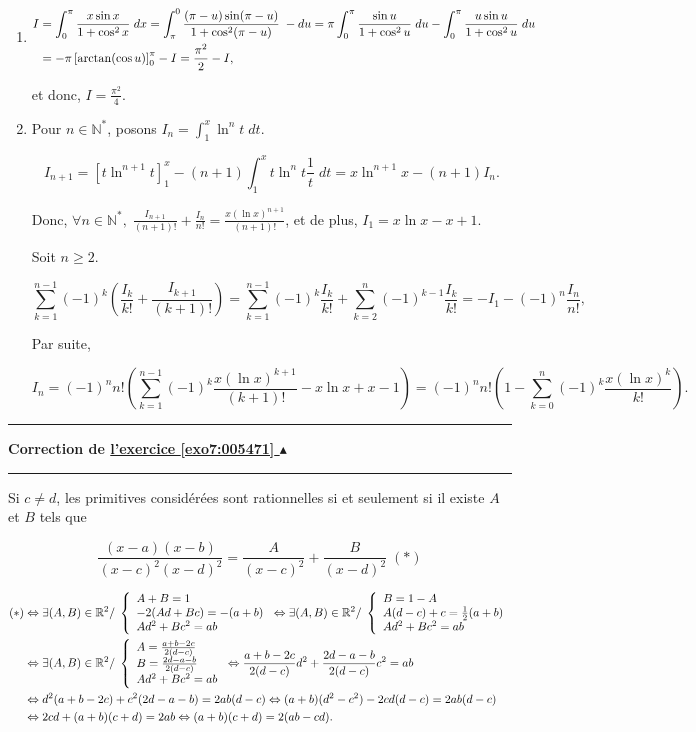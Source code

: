 \documentclass[11pt,a4paper]{article}
\newcommand{\Nn}{\mathbb{N}} \newcommand{\N}{\mathbb{N}}
\newcommand{\Rr}{\mathbb{R}} \newcommand{\R}{\mathbb{R}}
\newcommand{\Arctan}{\mathop{\mathrm{arctan}}\nolimits}
\newcounter{exo}
\newcommand{\correction}[1]{\hypertarget{cor7:#1}{}\label{cor7:#1}{\bf Correction de \hyperlink{exo7:#1}{l'exercice \ref{exo7:#1} $\blacktriangle$}}\vspace{1mm}\hrule\vspace{1mm}}
\newcommand{\fincorrection}{\vspace{1mm}\hrule\vspace*{7mm}}
\begin{document}
\begin{enumerate}
\item 

\begin{align*}\ensuremath
I&=\int_{0}^{\pi}\frac{x\sin x}{1+\cos^2x}\;dx=\int_{\pi}^{0}\frac{(\pi-u)\sin(\pi-u)}{1+\cos^2(\pi-u)}\;-du
=\pi\int_{0}^{\pi}\frac{\sin u}{1+\cos^2u}\;du-\int_{0}^{\pi}\frac{u\sin u}{1+\cos^2u}\;du\\
 &=-\pi\left[\Arctan(\cos u)\right]_{0}^{\pi}-I=\frac{\pi^2}{2}-I,
\end{align*}

et donc, $I=\frac{\pi^2}{4}$.

\item  Pour $n\in\Nn^*$, posons $I_n=\int_{1}^{x}\ln^nt\;dt$.

$$I_{n+1}=\left[t\ln^{n+1}t\right]_{1}^{x}-(n+1)\int_{1}^{x}t\ln^nt\frac{1}{t}\;dt=x\ln^{n+1}x-(n+1)I_n.$$

Donc, $\forall n\in\Nn^*,\;\frac{I_{n+1}}{(n+1)!}+\frac{I_n}{n!}=\frac{x(\ln x)^{n+1}}{(n+1)!}$, et de plus, $I_1=x\ln x-x+1$.

Soit $n\geq2$.

$$\sum_{k=1}^{n-1}(-1)^k(\frac{I_k}{k!}+\frac{I_{k+1}}{(k+1)!})=\sum_{k=1}^{n-1}(-1)^k\frac{I_k}{k!}+\sum_{k=2}^{n}(-1)^{k-1}\frac{I_k}{k!}=-I_1-(-1)^n\frac{I_n}{n!},$$

Par suite,

$$I_n=(-1)^nn!(\sum_{k=1}^{n-1}(-1)^k\frac{x(\ln x)^{k+1}}{(k+1)!}-x\ln x+x-1)=(-1)^nn!(1-\sum_{k=0}^{n}(-1)^{k}\frac{x(\ln x)^{k}}{k!}).$$
\end{enumerate}
\fincorrection
\correction{005471}
Si $c\neq d$, les primitives considérées sont rationnelles si et seulement si il existe $A$ et $B$ tels que

$$\frac{(x-a)(x-b)}{(x-c)^2(x-d)^2}=\frac{A}{(x-c)^2}+\frac{B}{(x-d)^2}\;(*)$$

\begin{align*}\ensuremath
(*)&\Leftrightarrow\exists(A,B)\in\Rr^2/\;\left\{
\begin{array}{l}
A+B=1\\
-2(Ad+Bc)=-(a+b)\\
Ad^2+Bc^2=ab
\end{array}
\right.\Leftrightarrow\exists(A,B)\in\Rr^2/\;\left\{
\begin{array}{l}
B=1-A\\
A(d-c)+c=\frac{1}{2}(a+b)\\
Ad^2+Bc^2=ab
\end{array}
\right.
\\
 &\Leftrightarrow\exists(A,B)\in\Rr^2/\;\left\{
\begin{array}{l}
A=\frac{a+b-2c}{2(d-c)}\\
B=\frac{2d-a-b}{2(d-c)}\\
Ad^2+Bc^2=ab
\end{array}
\right.
\Leftrightarrow\frac{a+b-2c}{2(d-c)}d^2+\frac{2d-a-b}{2(d-c)}c^2=ab\\
 &\Leftrightarrow d^2(a+b-2c)+c^2(2d-a-b)=2ab(d-c)\Leftrightarrow(a+b)(d^2-c^2)-2cd(d-c)=2ab(d-c)\\
 &\Leftrightarrow2cd+(a+b)(c+d)=2ab\Leftrightarrow(a+b)(c+d)=2(ab-cd).
\end{align*}
\end{document}
